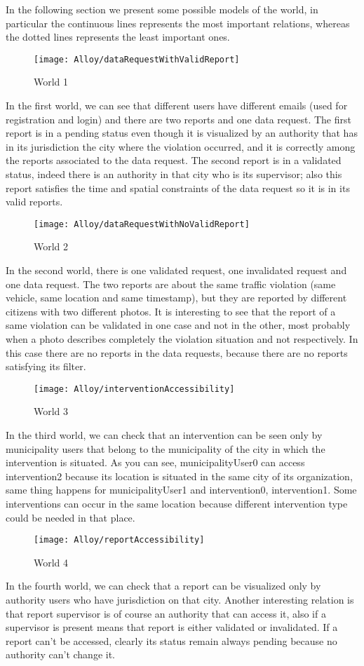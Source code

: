 In the following section we present some possible models of the world, in particular the continuous lines represents the most important relations, whereas the dotted lines represents the least important ones.
\begin{figure}[H]
	\centering
	\texttt{[image: Alloy/dataRequestWithValidReport]}
	\caption{World 1}
\end{figure}
In the first world, we can see that different users have different emails (used for registration and login) and there are two reports and one data request. The first report is in a pending status even though it is visualized by an authority that has in its jurisdiction the city where the violation occurred, and it is correctly among the reports associated to the data request. The second report is in a validated status, indeed there is an authority in that city who is its supervisor; also this report satisfies the time and spatial constraints of the data request so it is in its valid reports.
\begin{figure}[H]
	\centering
	\texttt{[image: Alloy/dataRequestWithNoValidReport]}
	\caption{World 2}
\end{figure}
In the second world, there is one validated request, one invalidated request and one data request. The two reports are about the same traffic violation (same vehicle, same location and same timestamp), but they are reported by different citizens with two different photos. It is interesting to see that the report of a same violation can be validated in one case and not in the other, most probably when a photo describes completely the violation situation and not respectively. In this case there are no reports in the data requests, because there are no reports satisfying its filter.
\begin{figure}[H]
	\centering
	\texttt{[image: Alloy/interventionAccessibility]}
	\caption{World 3}
\end{figure}

In the third world, we can check that an intervention can be seen only by municipality users that belong to the municipality of the city in which the intervention is situated. As you can see, municipalityUser0 can access intervention2 because its location is situated in the same city of its organization, same thing happens for municipalityUser1 and intervention0, intervention1. Some interventions can occur in the same location because different intervention type could be needed in that place.

\begin{figure}[H]
	\centering
	\texttt{[image: Alloy/reportAccessibility]}
	\caption{World 4}
\end{figure}

In the fourth world, we can check that a report can be visualized only by authority users who have jurisdiction on that city. Another interesting relation is that report supervisor is of course an authority that can access it, also if a supervisor is present means that report is either validated or invalidated. If a report can't be accessed, clearly its status remain always pending because no authority can't change it.